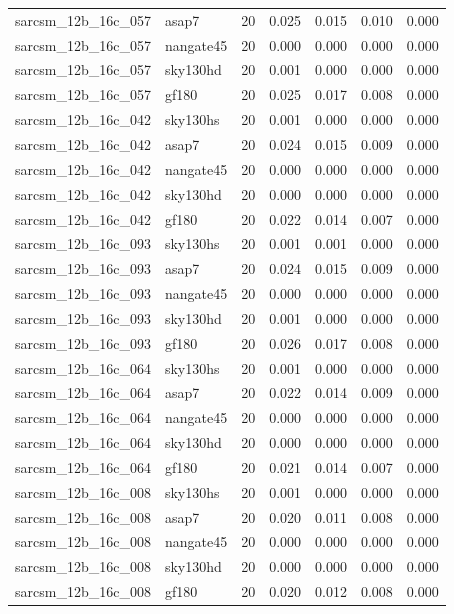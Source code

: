 \begin{tabular}{llrrrrr}
sarcsm\_12b\_16c\_057 & asap7 & 20 & 0.025 & 0.015 & 0.010 & 0.000 \\
sarcsm\_12b\_16c\_057 & nangate45 & 20 & 0.000 & 0.000 & 0.000 & 0.000 \\
sarcsm\_12b\_16c\_057 & sky130hd & 20 & 0.001 & 0.000 & 0.000 & 0.000 \\
sarcsm\_12b\_16c\_057 & gf180 & 20 & 0.025 & 0.017 & 0.008 & 0.000 \\
sarcsm\_12b\_16c\_042 & sky130hs & 20 & 0.001 & 0.000 & 0.000 & 0.000 \\
sarcsm\_12b\_16c\_042 & asap7 & 20 & 0.024 & 0.015 & 0.009 & 0.000 \\
sarcsm\_12b\_16c\_042 & nangate45 & 20 & 0.000 & 0.000 & 0.000 & 0.000 \\
sarcsm\_12b\_16c\_042 & sky130hd & 20 & 0.000 & 0.000 & 0.000 & 0.000 \\
sarcsm\_12b\_16c\_042 & gf180 & 20 & 0.022 & 0.014 & 0.007 & 0.000 \\
sarcsm\_12b\_16c\_093 & sky130hs & 20 & 0.001 & 0.001 & 0.000 & 0.000 \\
sarcsm\_12b\_16c\_093 & asap7 & 20 & 0.024 & 0.015 & 0.009 & 0.000 \\
sarcsm\_12b\_16c\_093 & nangate45 & 20 & 0.000 & 0.000 & 0.000 & 0.000 \\
sarcsm\_12b\_16c\_093 & sky130hd & 20 & 0.001 & 0.000 & 0.000 & 0.000 \\
sarcsm\_12b\_16c\_093 & gf180 & 20 & 0.026 & 0.017 & 0.008 & 0.000 \\
sarcsm\_12b\_16c\_064 & sky130hs & 20 & 0.001 & 0.000 & 0.000 & 0.000 \\
sarcsm\_12b\_16c\_064 & asap7 & 20 & 0.022 & 0.014 & 0.009 & 0.000 \\
sarcsm\_12b\_16c\_064 & nangate45 & 20 & 0.000 & 0.000 & 0.000 & 0.000 \\
sarcsm\_12b\_16c\_064 & sky130hd & 20 & 0.000 & 0.000 & 0.000 & 0.000 \\
sarcsm\_12b\_16c\_064 & gf180 & 20 & 0.021 & 0.014 & 0.007 & 0.000 \\
sarcsm\_12b\_16c\_008 & sky130hs & 20 & 0.001 & 0.000 & 0.000 & 0.000 \\
sarcsm\_12b\_16c\_008 & asap7 & 20 & 0.020 & 0.011 & 0.008 & 0.000 \\
sarcsm\_12b\_16c\_008 & nangate45 & 20 & 0.000 & 0.000 & 0.000 & 0.000 \\
sarcsm\_12b\_16c\_008 & sky130hd & 20 & 0.000 & 0.000 & 0.000 & 0.000 \\
sarcsm\_12b\_16c\_008 & gf180 & 20 & 0.020 & 0.012 & 0.008 & 0.000 \\

\end{tabular}
